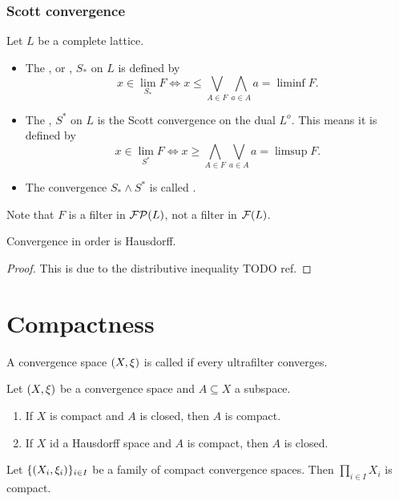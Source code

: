 \subsubsection{Scott convergence}

\begin{definition}
Let $L$ be a complete lattice.
\begin{itemize}
\item The , or , $S_*$ on $L$ is defined by
\[ x \in \lim_{S_*} F \iff x \leq \bigvee_{A\in F}\bigwedge_{a\in A}a = \liminf F. \]

\item The , $S^*$ on $L$ is the Scott convergence on the dual $L^o$. This means it is defined by
\[ x \in \lim_{S^*} F \iff x \geq \bigwedge_{A\in F}\bigvee_{a\in A}a = \limsup F. \]
\item The convergence $S_* \wedge S^*$ is called .
\end{itemize}
\end{definition}
Note that $F$ is a filter in $\operatorname{\mathcal{FP}}(L)$, not a filter in $\operatorname{\mathcal{F}}(L)$.

\begin{proposition}
Convergence in order is Hausdorff.
\end{proposition}
\begin{proof}
This is due to the distributive inequality TODO ref.
\end{proof}

\section{Compactness}
\begin{definition}
A convergence space $\left( X,\xi \right)$ is called  if every ultrafilter converges.
\end{definition}

\begin{proposition}
Let $\left( X,\xi \right)$ be a convergence space and $A\subseteq X$ a subspace.
\begin{enumerate}
\item If $X$ is compact and $A$ is closed, then $A$ is compact.
\item If $X$ id a Hausdorff space and $A$ is compact, then $A$ is closed.
\end{enumerate}
\end{proposition}

\begin{theorem}[Tychonoff]
Let $\{\left( X_i, \xi_i \right)\}_{i\in I}$ be a family of compact convergence spaces. Then $\prod_{i\in I}X_i$ is compact.
\end{theorem}

